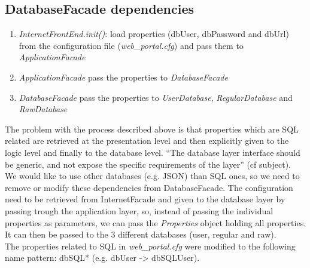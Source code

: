 \subsection{DatabaseFacade dependencies}

\begin{enumerate}
\item \emph{InternetFrontEnd.init()}: load properties (dbUser, dbPassword and
    dbUrl) from the configuration file (\emph{web\_portal.cfg}) and pass them to
    \emph{ApplicationFacade}
    
\item \emph{ApplicationFacade} pass the properties to \emph{DatabaseFacade}

\item \emph{DatabaseFacade} pass the properties to \emph{UserDatabase},
    \emph{RegularDatabase} and \emph{RawDatabase}
\end{enumerate}

The problem with the process described above is that properties which are SQL
related are retrieved at the presentation level and then explicitly given to
the logic level and finally to the database level. ``The database layer
interface should be generic, and not expose the specific requirements of the
layer'' (cf subject).\\

We would like to use other databases (e.g. JSON) than SQL ones, so we need to
remove or modify these dependencies from DatabaseFacade. The configuration need
to be retrieved from InternetFacade and given to the database layer by passing
trough the application layer, so, instead of passing the individual properties
as parameters, we can pass the \emph{Properties} object holding all properties.
It can then be passed to the 3 different databases (user, regular and raw).\\

The properties related to SQL in \emph{web\_portal.cfg} were modified to the
following name pattern: dbSQL* (e.g. dbUser -> dbSQLUser).
\newpage
